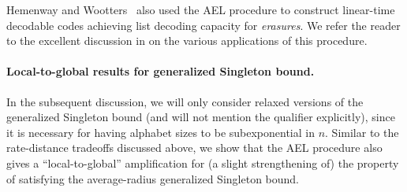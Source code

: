Hemenway and Wootters~\cite{HW15} also used the AEL procedure to construct linear-time decodable codes achieving list decoding capacity for \textit{erasures}. We refer the reader to the excellent discussion in \cite{KMRZS16} on the various applications of this procedure.
%
\vspace{-5 pt}
\paragraph{Local-to-global results for generalized Singleton bound.}
%
In the subsequent discussion, we will only consider relaxed versions of the generalized Singleton bound (and will not mention the qualifier explicitly), since it is necessary for having alphabet sizes to be subexponential in $n$.
% 
Similar to the rate-distance tradeoffs discussed above, we show that the AEL procedure also gives a ``local-to-global'' amplification for (a slight strengthening of) the property of satisfying the average-radius generalized Singleton bound. 
%


